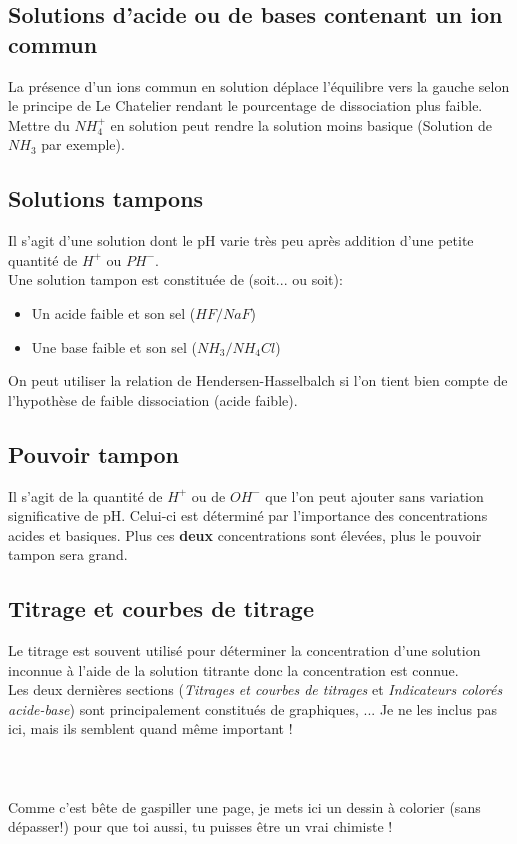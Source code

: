 \documentclass[12pt, a4paper]{article}
\begin{document}
\subsection{Solutions d'acide ou de bases contenant un ion commun}
La présence d'un ions commun en solution déplace l'équilibre vers la gauche selon le principe de Le Chatelier rendant le pourcentage de dissociation plus faible. \\
Mettre du $NH_4^+$ en solution peut rendre la solution moins basique (Solution de $NH_3$ par exemple).

\subsection{Solutions tampons}
Il s'agit d'une solution dont le pH varie très peu après addition d'une petite quantité de $H^+$ ou $PH^-$.\\
Une solution tampon est constituée de (soit... ou soit): 
\begin{itemize}
\item Un acide faible et son sel ($HF/NaF$)
\item Une base faible et son sel ($NH_3/NH_4Cl$)
\end{itemize}
On peut utiliser la relation de Hendersen-Hasselbalch si l'on tient bien compte de l'hypothèse de faible dissociation (acide faible).

\subsection{Pouvoir tampon}
Il s'agit de la quantité de $H^+$ ou de $OH^-$ que l'on peut ajouter sans variation significative de pH. Celui-ci est déterminé par l'importance des concentrations acides et basiques. Plus ces \textbf{deux} concentrations sont élevées, plus le pouvoir tampon sera grand. 

\subsection{Titrage et courbes de titrage}
Le titrage est souvent utilisé pour déterminer la concentration d'une solution inconnue à l'aide de la solution titrante donc la concentration est connue.\\

Les deux dernières sections (\textit{Titrages et courbes de titrages} et \textit{Indicateurs colorés acide-base}) sont principalement constitués de graphiques, ... Je ne les inclus pas ici, mais ils semblent quand même important ! \\
\\
\\
\\
Comme c'est bête de gaspiller une page, je mets ici un dessin à colorier (sans dépasser!) pour que toi aussi, tu puisses être un vrai chimiste ! 
\end{document}
